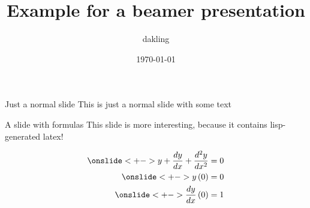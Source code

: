 \documentclass[10pt]{beamer}
\author{dakling}
\date{\today}
\title{Example for a beamer presentation}
\begin{document}
\maketitle

\begin{frame}[label={sec:org6a66e81}]{Just a normal slide}
This is just a normal slide with some text
\end{frame}
\begin{frame}[label={sec:orge2a506c}]{A slide with formulas}
This slide is more interesting, because it contains lisp-generated latex!

\begin{align*}
\onslide<+->{
y + \frac{d y}{d x} + \frac{d^{2 } y}{d x^{2 }} =0 }\\
\onslide<+->{
y \left(0 \right) = 0 }\\
\onslide<+->{
\frac{d y}{d x} \left(0 \right) = 1 }
\end{align*}
\end{frame}
\end{document}
